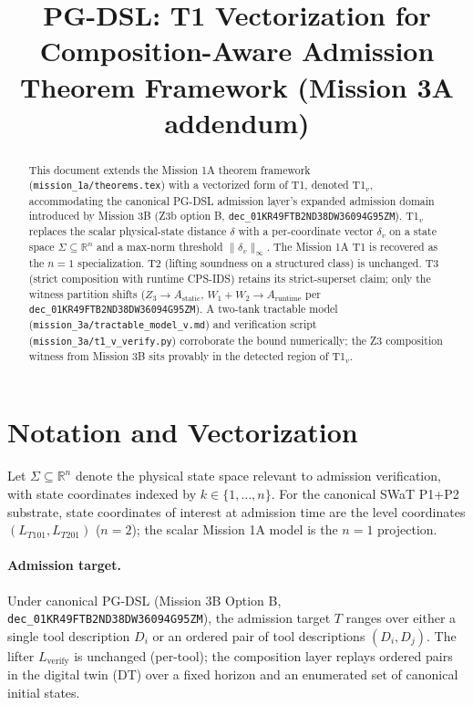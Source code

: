 \documentclass[11pt]{article}
\title{PG-DSL: T1 Vectorization for Composition-Aware Admission \\
       \large{Theorem Framework (Mission 3A addendum)}}
\author{}
\date{}
\begin{document}
\maketitle

\begin{abstract}
This document extends the Mission 1A theorem framework (\texttt{mission\_1a/theorems.tex})
with a vectorized form of T1, denoted T1${}_v$, accommodating the canonical PG-DSL
admission layer's expanded admission domain introduced by Mission 3B (Z3b option B,
\texttt{dec\_01KR49FTB2ND38DW36094G95ZM}). T1${}_v$ replaces the scalar physical-state
distance $\delta$ with a per-coordinate vector $\delta_v$ on a state space
$\Sigma \subseteq \mathbb{R}^{n}$ and a max-norm threshold $\|\delta_v\|_\infty$. The
Mission 1A T1 is recovered as the $n = 1$ specialization. T2 (lifting soundness on a
structured class) is unchanged. T3 (strict composition with runtime CPS-IDS) retains
its strict-superset claim; only the witness partition shifts ($Z_3 \to A_{\text{static}}$,
$W_1 + W_2 \to A_{\text{runtime}}$ per \texttt{dec\_01KR49FTB2ND38DW36094G95ZM}).
A two-tank tractable model (\texttt{mission\_3a/tractable\_model\_v.md}) and verification
script (\texttt{mission\_3a/t1\_v\_verify.py}) corroborate the bound numerically; the
Z3 composition witness from Mission 3B sits provably in the detected region of T1${}_v$.
\end{abstract}

\section{Notation and Vectorization}
\label{sec:notation}

Let $\Sigma \subseteq \mathbb{R}^{n}$ denote the physical state space relevant to
admission verification, with state coordinates indexed by
$k \in \{1, \dots, n\}$. For the canonical SWaT P1+P2 substrate, state coordinates
of interest at admission time are the level coordinates
$(L_{T101}, L_{T201})$ ($n = 2$); the scalar Mission 1A model is the
$n = 1$ projection.

\paragraph{Admission target.}
Under canonical PG-DSL (Mission 3B Option B,
\texttt{dec\_01KR49FTB2ND38DW36094G95ZM}), the admission target $T$ ranges
over either a single tool description $D_i$ or an ordered pair of tool
descriptions $(D_i, D_j)$. The lifter $L_{\text{verify}}$ is unchanged
(per-tool); the composition layer replays ordered pairs in the digital twin
(DT) over a fixed horizon and an enumerated set of canonical initial states.
\end{document}
